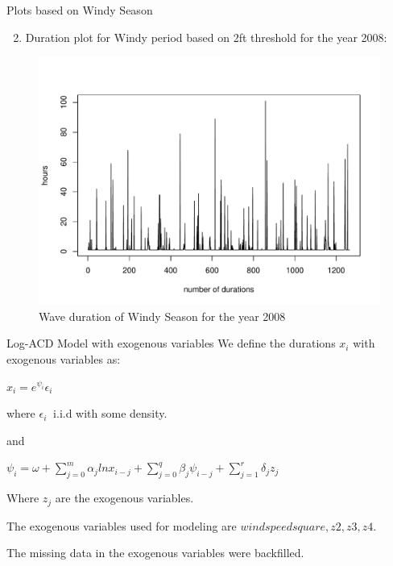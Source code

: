 \documentclass[
  ignorenonframetext,
]{beamer}
\providecommand{\tightlist}{%
  \setlength{\itemsep}{0pt}\setlength{\parskip}{0pt}}
\begin{document}
\begin{frame}{Plots based on Windy Season}
\protect\hypertarget{plots-based-on-windy-season}{}
\begin{enumerate}
[1)]
\setcounter{enumi}{1}
\tightlist
\item
  Duration plot for Windy period based on 2ft threshold for the year
  2008:
\end{enumerate}

\begin{figure}
\includegraphics[width=1\linewidth]{Picture2} \caption{Wave duration of Windy Season for the year 2008}\label{fig:Windy Season}
\end{figure}
\end{frame}

\begin{frame}{Log-ACD Model with exogenous variables}
\protect\hypertarget{log-acd-model-with-exogenous-variables}{}
We define the durations \(x_i\) with exogenous variables as:

\(x_i = e^{\psi_i} \epsilon_i\)

where \(\epsilon_i ~\) i.i.d with some density.

and

\(\psi_i = \omega + \sum_{j=0}^m \alpha_j ln x_{i-j} + \sum_{j=0}^q \beta_j \psi_{i-j}+\sum_{j=1}^r\delta_jz_{j}\)

Where \(z_{j}\) are the exogenous variables.

The exogenous variables used for modeling are
\(wind speed square, z2, z3, z4\).

The missing data in the exogenous variables were backfilled.
\end{frame}
\end{document}

